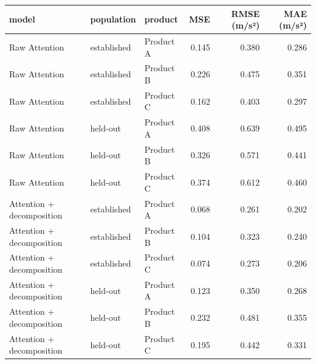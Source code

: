 \begin{tabular}{lllrrr}
\toprule
model & population & product & MSE & RMSE (m/s²) & MAE (m/s²) \\
\midrule
Raw Attention & established & Product A & 0.145 & 0.380 & 0.286 \\
Raw Attention & established & Product B & 0.226 & 0.475 & 0.351 \\
Raw Attention & established & Product C & 0.162 & 0.403 & 0.297 \\
Raw Attention & held-out & Product A & 0.408 & 0.639 & 0.495 \\
Raw Attention & held-out & Product B & 0.326 & 0.571 & 0.441 \\
Raw Attention & held-out & Product C & 0.374 & 0.612 & 0.460 \\
Attention + decomposition & established & Product A & 0.068 & 0.261 & 0.202 \\
Attention + decomposition & established & Product B & 0.104 & 0.323 & 0.240 \\
Attention + decomposition & established & Product C & 0.074 & 0.273 & 0.206 \\
Attention + decomposition & held-out & Product A & 0.123 & 0.350 & 0.268 \\
Attention + decomposition & held-out & Product B & 0.232 & 0.481 & 0.355 \\
Attention + decomposition & held-out & Product C & 0.195 & 0.442 & 0.331 \\
\bottomrule
\end{tabular}
